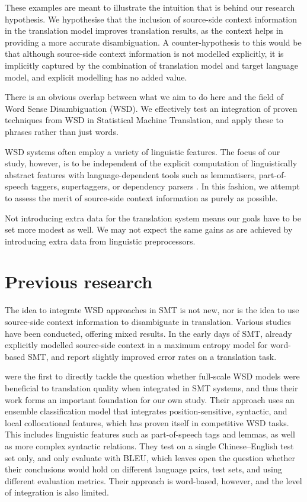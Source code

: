 \documentclass[smallextended]{svjour3}       %
\theoremstyle{break}
\begin{document}
These examples are meant to illustrate the intuition that is behind our
research hypothesis. We hypothesise that the inclusion of source-side context
information in the translation model improves translation results, as the
context helps in providing a more accurate disambiguation. A counter-hypothesis
to this would be that although source-side context information is not modelled
explicitly, it is implicitly captured by the combination of translation model
and target language model, and explicit modelling has no added value.

There is an obvious overlap between what we aim to do here and the field of
Word Sense Disambiguation (WSD). We effectively test an integration of proven
techniques from WSD in Statistical Machine Translation, and apply these to
phrases rather than just words.

WSD systems often employ a variety of linguistic features. The focus of our
study, however, is to be independent of the explicit computation of
linguistically abstract features with language-dependent tools such as
lemmatisers, part-of-speech taggers, supertaggers, or dependency parsers
\cite{Rejwanul+11}. 
In this fashion, we attempt to assess the merit of source-side
context information as purely as possible.

Not introducing extra data for the translation system means our goals have to
be set more modest as well. We may not expect the same gains as are achieved by
introducing extra data from linguistic preprocessors.

\section{Previous research}

The idea to integrate WSD approaches in SMT is not new, nor is the idea to use
source-side context information to disambiguate in translation. Various studies
have been conducted, offering mixed results. In the early days of SMT,
\cite{GarciaVarea+02} already explicitly modelled source-side context in a
maximum entropy model for word-based SMT, and report slightly improved error
rates on a translation task.

\cite{CarpuatWu05} were the first to directly tackle the question whether
full-scale WSD models were beneficial to translation quality when integrated in
SMT systems, and thus their work forms an important foundation for our own study.
Their approach uses an ensemble classification model that integrates
position-sensitive, syntactic, and local collocational features, which has
proven itself in competitive WSD tasks. This includes linguistic features such
as part-of-speech tags and lemmas, as well as more complex syntactic relations.
They test on a single Chinese--English test set only, and only
evaluate with BLEU,
which leaves open the question whether their conclusions would hold on
different language pairs, test sets, and using different evaluation metrics.
Their approach is word-based, however, and the level of integration is also limited.
\end{document}
